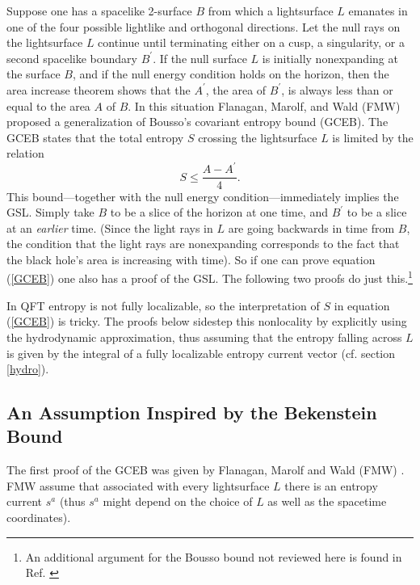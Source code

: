 \documentclass{article}
\begin{document}
Suppose one has a spacelike 2-surface $B$ from which a lightsurface $L$ emanates in one of the four possible lightlike and orthogonal directions.  Let the null rays on the lightsurface $L$ continue until terminating either on a cusp, a singularity, or a second spacelike boundary $B^{\prime}$.  If the null surface $L$ is initially nonexpanding at the surface $B$, and if the null energy condition holds on the horizon, then the area increase theorem shows that the $A^\prime$, the area of $B^\prime$, is always less than or equal to the area $A$ of $B$.  In this situation Flanagan, Marolf, and Wald (FMW) proposed a generalization of Bousso's covariant entropy bound (GCEB).  The GCEB states that the total entropy $S$ crossing the lightsurface $L$ is limited by the relation
\begin{equation}\label{GCEB}
S \le \frac{A - A^{\prime}}{4}.
\end{equation}
This bound---together with the null energy condition---immediately implies the GSL.  Simply take $B$ to be a slice of the horizon at one time, and $B^\prime$ to be a slice at an \emph{earlier} time.  (Since the light rays in $L$ are going backwards in time from $B$, the condition that the light rays are nonexpanding corresponds to the fact that the black hole's area is increasing with time).  So if one can prove equation (\ref{GCEB}) one also has a proof of the GSL.  The following two proofs do just this.\footnote{An additional argument for the Bousso bound not reviewed here is found in Ref. \cite{pesci07}}

In QFT entropy is not fully localizable, so the interpretation of $S$ in equation (\ref{GCEB}) is tricky.  The proofs below sidestep this nonlocality by explicitly using the hydrodynamic approximation, thus assuming that the entropy falling across $L$ is given by the integral of a fully localizable entropy current vector (cf. section \ref{hydro}).

\subsection{An Assumption Inspired by the Bekenstein Bound}\label{FMW}

The first proof of the GCEB was given by Flanagan, Marolf and Wald (FMW) \cite{FMW00}.  FMW assume that associated with every lightsurface $L$ there is an entropy current $s^a$ (thus $s^a$ might depend on the choice of $L$ as well as the spacetime coordinates).
\end{document}
